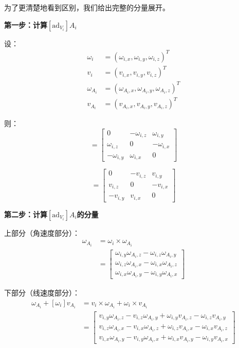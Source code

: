 \documentclass[12pt,a4paper]{article}
\begin{document}
为了更清楚地看到区别，我们给出完整的分量展开。

\textbf{第一步：计算$[\text{ad}_{V_i}] A_i$}

设：
\begin{align}
\omega_i &= (\omega_{i,x}, \omega_{i,y}, \omega_{i,z})^T \\
v_i &= (v_{i,x}, v_{i,y}, v_{i,z})^T \\
\omega_{A_i} &= (\omega_{A_i,x}, \omega_{A_i,y}, \omega_{A_i,z})^T \\
v_{A_i} &= (v_{A_i,x}, v_{A_i,y}, v_{A_i,z})^T
\end{align}

则：
\begin{equation}
[\omega_i] = \begin{bmatrix}
0 & -\omega_{i,z} & \omega_{i,y} \\
\omega_{i,z} & 0 & -\omega_{i,x} \\
-\omega_{i,y} & \omega_{i,x} & 0
\end{bmatrix}
\end{equation}

\begin{equation}
[v_i] = \begin{bmatrix}
0 & -v_{i,z} & v_{i,y} \\
v_{i,z} & 0 & -v_{i,x} \\
-v_{i,y} & v_{i,x} & 0
\end{bmatrix}
\end{equation}

\textbf{第二步：计算$[\text{ad}_{V_i}] A_i$的分量}

上部分（角速度部分）：
\begin{align}
[\omega_i] \omega_{A_i} &= \omega_i \times \omega_{A_i} \\
&= \begin{bmatrix}
\omega_{i,y} \omega_{A_i,z} - \omega_{i,z} \omega_{A_i,y} \\
\omega_{i,z} \omega_{A_i,x} - \omega_{i,x} \omega_{A_i,z} \\
\omega_{i,x} \omega_{A_i,y} - \omega_{i,y} \omega_{A_i,x}
\end{bmatrix}
\end{align}

下部分（线速度部分）：
\begin{align}
[v_i] \omega_{A_i} + [\omega_i] v_{A_i} &= v_i \times \omega_{A_i} + \omega_i \times v_{A_i} \\
&= \begin{bmatrix}
v_{i,y} \omega_{A_i,z} - v_{i,z} \omega_{A_i,y} + \omega_{i,y} v_{A_i,z} - \omega_{i,z} v_{A_i,y} \\
v_{i,z} \omega_{A_i,x} - v_{i,x} \omega_{A_i,z} + \omega_{i,z} v_{A_i,x} - \omega_{i,x} v_{A_i,z} \\
v_{i,x} \omega_{A_i,y} - v_{i,y} \omega_{A_i,x} + \omega_{i,x} v_{A_i,y} - \omega_{i,y} v_{A_i,x}
\end{bmatrix}
\end{align}
\end{document}
